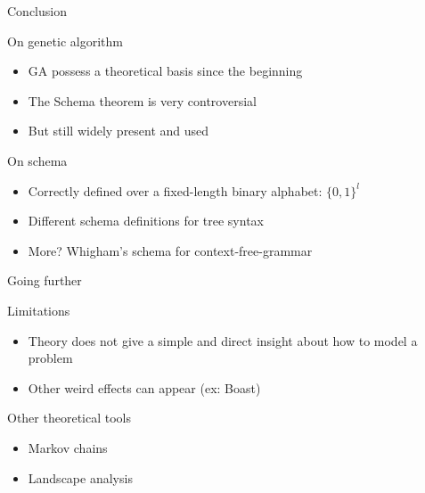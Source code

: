 \begin{frame}{Conclusion}

  \begin{block}{On genetic algorithm}
    \begin{itemize}
    \item GA possess a theoretical basis since the beginning
    \item The Schema theorem is very controversial
    \item But still widely present and used
    \end{itemize}
  \end{block}

  \begin{block}{On schema}
    \begin{itemize}
      \item Correctly defined over a fixed-length binary alphabet: $\{0,1\}^l$
      \item Different schema definitions for tree syntax
      \item More? Whigham's schema for context-free-grammar\cite{whigham1995}
    \end{itemize}
  \end{block}
\end{frame}

\begin{frame}{Going further}
  \begin{block}{Limitations}
    \begin{itemize}
      \item Theory does not give a simple and direct insight about how to model a problem
      \item Other weird effects can appear (ex: Boast)
    \end{itemize}
  \end{block}

  \begin{block}{Other theoretical tools}
    \begin{itemize}
      \item Markov chains
      \item Landscape analysis
    \end{itemize}
  \end{block}
\end{frame}
